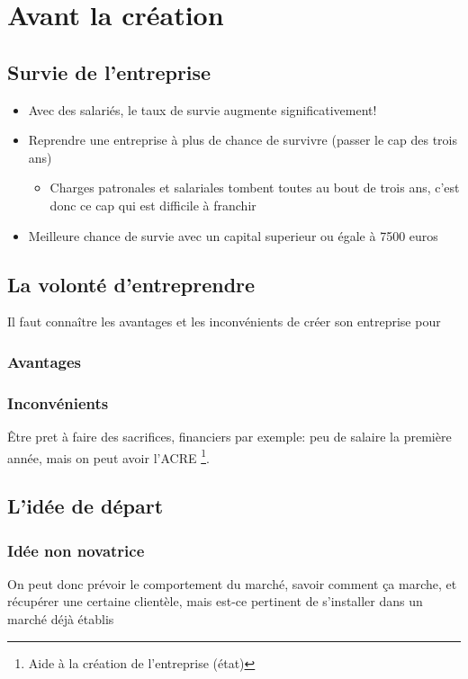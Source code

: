 \documentclass[12pt,a4paper,openany]{report}
\begin{document}
	\maketitle
	\chapter{Avant la création}
	\section{Survie de l'entreprise}
	\begin{itemize}
		\item Avec des salariés, le taux de survie augmente significativement! 	
		\item Reprendre une entreprise à plus de chance de survivre (passer le cap des trois ans)
			\begin{itemize}
				\item Charges patronales et salariales tombent toutes au bout de trois ans, c'est donc ce cap qui est difficile à franchir
			\end{itemize}
		\item Meilleure chance de survie avec un capital superieur ou égale à 7500 euros
	\end{itemize}
	\section{La volonté d'entreprendre}
	Il faut connaître les avantages et les inconvénients de créer son entreprise pour  
	\subsection{Avantages}
	\subsection{Inconvénients}
	Être pret à faire des sacrifices, financiers par exemple: peu de salaire la première année, mais on peut avoir l'ACRE \footnote{Aide à la création de l'entreprise
	(état)}. 
	\section{L'idée de départ}
	\subsection{Idée non novatrice}
	On peut donc prévoir le comportement du marché, savoir comment ça marche, et récupérer une certaine clientèle, mais est-ce pertinent de s'installer dans 
	un marché déjà établis
\end{document}
